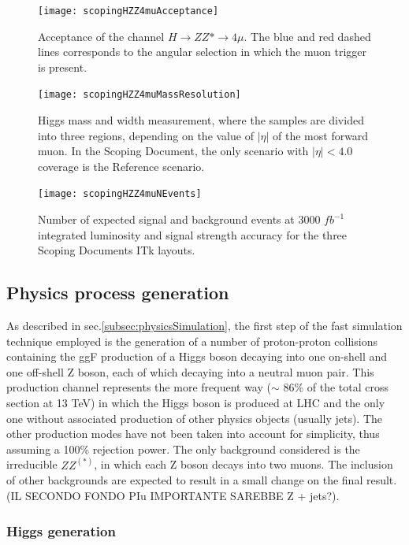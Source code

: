 \documentclass[a4paper,twoside,12pt]{article}
\begin{document}
\begin{figure} [h]
	\centering
	\texttt{[image: scopingHZZ4muAcceptance]}
	\caption{Acceptance of the channel $H \rightarrow ZZ* \rightarrow 4\mu$. The blue and 
	red dashed lines corresponds to the angular selection in which the muon trigger is present.}
	\label{fig:scopingHZZ4muAcceptance}
\end{figure}

\begin{figure} [h]
	\centering
	\texttt{[image: scopingHZZ4muMassResolution]}
	\caption{Higgs mass and width measurement, where the samples are divided into three 
	regions, depending on the value of $|\eta|$ of the most forward muon\cite{scoping}. In the Scoping Document, the only scenario with $|\eta| < 4.0$ coverage is the Reference scenario.}
	\label{fig:scopingHZZ4muMassResolution}
\end{figure}

\begin{figure} [h]
	\centering
	\texttt{[image: scopingHZZ4muNEvents]}
	\caption{Number of expected signal and background events at 3000 $fb^{-1}$ integrated
	luminosity and signal strength accuracy for the three Scoping Documents ITk layouts\cite{scoping}.}
	\label{fig:scopingHZZ4muNEvents}
\end{figure}


\subsection{Physics process generation}
As described in sec.\ref{subsec:physicsSimulation}, the first step of the fast simulation 
technique employed is the generation of a number of proton-proton collisions containing the
ggF production of a Higgs boson decaying into one on-shell and one off-shell Z boson, 
each of which decaying into a neutral muon pair. This production channel represents the more
frequent way ($\sim$ 86\% of the total cross section at 13 TeV) in which the Higgs boson is produced at LHC and the only one without 
associated production of other physics objects (usually jets). The other production modes have not been taken
into account for simplicity, thus assuming a 100\% rejection power. The only background considered is the irreducible $ZZ^{(*)}$, 
in which each Z boson decays into two muons. The inclusion of other backgrounds are expected to 
result in a small change on the final result\cite{scoping}. (IL SECONDO FONDO PIu IMPORTANTE SAREBBE Z + jets?).

\subsubsection{Higgs generation}
\end{document}
